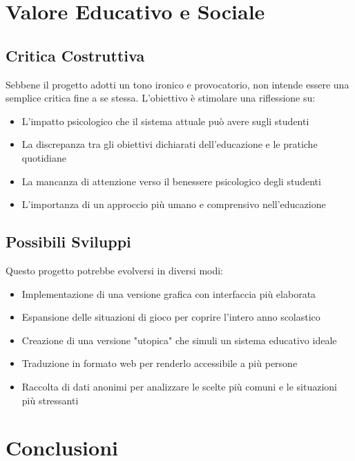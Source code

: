 \documentclass[a4paper,12pt]{article}
\begin{document}
\section{Valore Educativo e Sociale}

\subsection{Critica Costruttiva}

Sebbene il progetto adotti un tono ironico e provocatorio, non intende essere una semplice critica fine a se stessa. L'obiettivo è stimolare una riflessione su:

\begin{itemize}
    \item L'impatto psicologico che il sistema attuale può avere sugli studenti
    \item La discrepanza tra gli obiettivi dichiarati dell'educazione e le pratiche quotidiane
    \item La mancanza di attenzione verso il benessere psicologico degli studenti
    \item L'importanza di un approccio più umano e comprensivo nell'educazione
\end{itemize}

\subsection{Possibili Sviluppi}

Questo progetto potrebbe evolversi in diversi modi:

\begin{itemize}
    \item Implementazione di una versione grafica con interfaccia più elaborata
    \item Espansione delle situazioni di gioco per coprire l'intero anno scolastico
    \item Creazione di una versione "utopica" che simuli un sistema educativo ideale
    \item Traduzione in formato web per renderlo accessibile a più persone
    \item Raccolta di dati anonimi per analizzare le scelte più comuni e le situazioni più stressanti
\end{itemize}

\section{Conclusioni}
\end{document}
